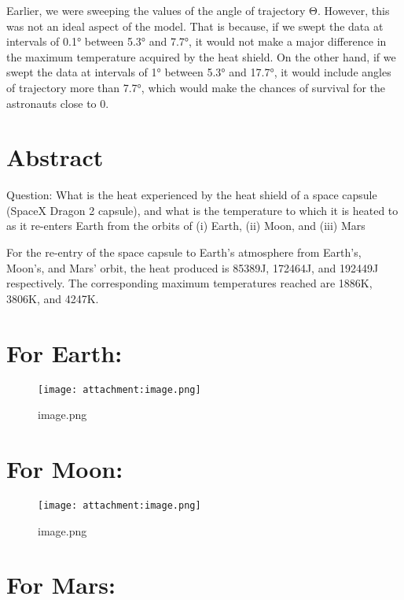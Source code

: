 \documentclass[11pt]{article}
\makeatletter
\def\maxwidth{\ifdim\Gin@nat@width>\linewidth\linewidth
    \else\Gin@nat@width\fi}
\let\Oldincludegraphics\includegraphics
\renewcommand{\includegraphics}[1]{\Oldincludegraphics[width=.8\maxwidth]{#1}}
\makeatother
\begin{document}
    Earlier, we were sweeping the values of the angle of trajectory Θ.
However, this was not an ideal aspect of the model. That is because, if
we swept the data at intervals of 0.1° between 5.3° and 7.7°, it would
not make a major difference in the maximum temperature acquired by the
heat shield. On the other hand, if we swept the data at intervals of 1°
between 5.3° and 17.7°, it would include angles of trajectory more than
7.7°, which would make the chances of survival for the astronauts close
to 0.

    \hypertarget{abstract}{%
\section{Abstract}\label{abstract}}

    Question: What is the heat experienced by the heat shield of a space
capsule (SpaceX Dragon 2 capsule), and what is the temperature to which
it is heated to as it re-enters Earth from the orbits of (i) Earth, (ii)
Moon, and (iii) Mars

For the re-entry of the space capsule to Earth's atmosphere from
Earth's, Moon's, and Mars' orbit, the heat produced is 85389J, 172464J,
and 192449J respectively. The corresponding maximum temperatures reached
are 1886K, 3806K, and 4247K.

    \hypertarget{for-earth}{%
\section{For Earth:}\label{for-earth}}

    \begin{figure}
\centering
\texttt{[image: attachment:image.png]}
\caption{image.png}
\end{figure}

    \hypertarget{for-moon}{%
\section{For Moon:}\label{for-moon}}

    \begin{figure}
\centering
\texttt{[image: attachment:image.png]}
\caption{image.png}
\end{figure}

    \hypertarget{for-mars}{%
\section{For Mars:}\label{for-mars}}
\end{document}
